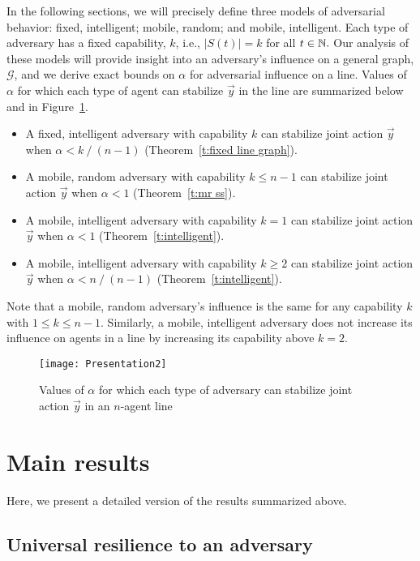 In the following sections, we will precisely define three models of adversarial behavior: fixed, intelligent; mobile, random; and mobile, intelligent. Each type of adversary has a fixed capability, $k$, i.e., $|S(t)| = k$ for all $t\in\mathbb{N}.$ 
Our analysis of these models will provide insight into an adversary's influence on a general graph, $\mathcal{G}$, and we derive exact bounds on $\alpha$ for adversarial influence on a line. Values of $\alpha$ for which each type of agent can stabilize $\vec{y}$ in the line are summarized below and in Figure~\ref{f:barGraph}.
\begin{itemize}
\item A fixed, intelligent adversary with capability $k$ can stabilize joint action $\vec{y}$ when $\alpha<k\mathop{/}(n-1)$ (Theorem~\ref{t:fixed line graph}).
\item A mobile, random adversary with capability $k\leq n-1$ can stabilize joint action $\vec{y}$ when $\alpha <1$ (Theorem~\ref{t:mr ss}).
\item A mobile, intelligent adversary with capability $k=1$ can stabilize joint action $\vec{y}$ when $\alpha <1$ (Theorem~\ref{t:intelligent}).
\item A mobile, intelligent adversary with capability $k\geq 2$ can stabilize joint action $\vec{y}$ when $\alpha <n\mathop{/}(n-1)$ (Theorem~\ref{t:intelligent}).
\end{itemize}
Note that a mobile, random adversary's influence is the same for any capability $k$ with $1\leq k\leq n-1.$ Similarly, a mobile, intelligent adversary does not increase its influence on agents in a line by increasing its capability above $k=2.$

\begin{figure}[!]
  \centering
    \texttt{[image: Presentation2]}
  \caption{Values of $\alpha$ for which each type of adversary can stabilize joint action $\vec{y}$ in an $n$-agent line}\label{f:barGraph}
\end{figure}

\section{Main results}
Here, we present a detailed version of the results summarized above. 

\subsection{Universal resilience to an adversary}


